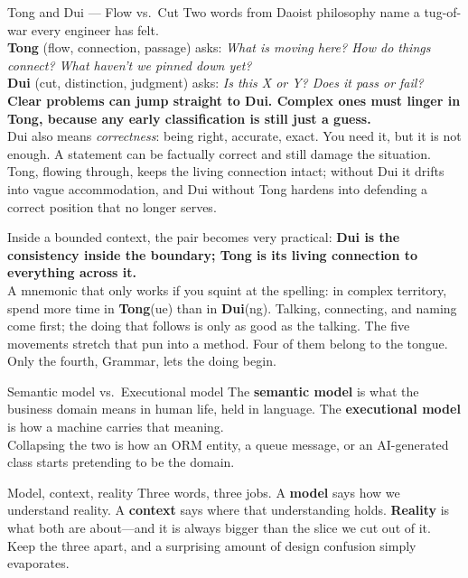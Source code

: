 \documentclass[10pt,a4paper]{article}
\newcounter{movement}
\begin{document}
\begin{lens}{Tong and Dui — Flow vs.\ Cut}
Two words from Daoist philosophy name a tug-of-war every engineer has felt.\\

\textbf{Tong} (flow, connection, passage) asks: \emph{What is moving here? How do things connect? What haven't we pinned down yet?}\\

\textbf{Dui} (cut, distinction, judgment) asks: \emph{Is this X or Y? Does it pass or fail?}\\

\textbf{Clear problems can jump straight to Dui. Complex ones must linger in Tong, because any early classification is still just a guess.}\\

Dui also means \emph{correctness}: being right, accurate, exact. You need it, but it is not enough. A statement can be factually correct and still damage the situation. Tong, flowing through, keeps the living connection intact; without Dui it drifts into vague accommodation, and Dui without Tong hardens into defending a correct position that no longer serves.

Inside a bounded context, the pair becomes very practical: \textbf{Dui is the consistency inside the boundary; Tong is its living connection to everything across it.}\\

A mnemonic that only works if you squint at the spelling: in complex territory, spend more time in \textbf{Tong}(ue) than in \textbf{Dui}(ng). Talking, connecting, and naming come first; the doing that follows is only as good as the talking. The five movements stretch that pun into a method. Four of them belong to the tongue. Only the fourth, Grammar, lets the doing begin.
\end{lens}

\begin{lens}{Semantic model vs.\ Executional model}
The \textbf{semantic model} is what the business domain means in human life, held in language. The \textbf{executional model} is how a machine carries that meaning.\\

Collapsing the two is how an ORM entity, a queue message, or an AI-generated class starts pretending to be the domain.
\end{lens}

\begin{lens}{Model, context, reality}
Three words, three jobs. A \textbf{model} says how we understand reality. A \textbf{context} says where that understanding holds. \textbf{Reality} is what both are about—and it is always bigger than the slice we cut out of it.\\

Keep the three apart, and a surprising amount of design confusion simply evaporates.
\end{lens}
\end{document}
